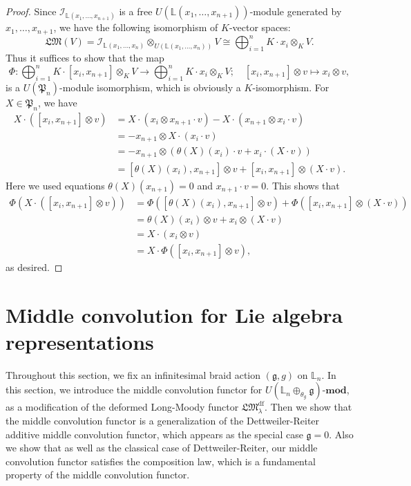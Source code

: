 \documentclass[a4paper,12pt]{article}
\theoremstyle{definition}
\theoremstyle{remark}
\begin{document}
\begin{proof}
Since $\mathcal{I}_{\mathbb{L}(x_{1},\ldots,x_{n+1})}$
is a free $U(\mathbb{L}(x_{1},\ldots,x_{n+1}))$-module generated by $x_{1},\ldots,x_{n+1}$, 
we have the following isomorphism of $K$-vector spaces:
\[
	\mathfrak{LM}(V)=\mathcal{I}_{\mathbb{L}(x_{1},\ldots,x_{n})}\otimes_{U(\mathbb{L}(x_{1},\ldots,x_{n}))} V\cong \bigoplus_{i=1}^{n} K\cdot x_{i} \otimes_{K} V.
\] 
Thus it suffices to show that 
the map   
\[
	\Phi\colon \bigoplus_{i=1}^{n} K\cdot [x_{i},x_{n+1}] \otimes_{K} V\rightarrow 
	\bigoplus_{i=1}^{n} K\cdot x_{i} \otimes_{K} V;\quad
	[x_i,x_{n+1}]\otimes v\mapsto x_{i}\otimes v,
\]
is a $U(\mathfrak{P}_{n})$-module isomorphism, which is obviously a $K$-isomorphism.
For $X\in \mathfrak{P}_{n}$,
we have 
\begin{align*}
	X\cdot ([x_i,x_{n+1}]\otimes v)&=X\cdot (x_{i}\otimes x_{n+1}\cdot v)-X\cdot (x_{n+1}\otimes x_{i}\cdot v)\\
	&=-x_{n+1}\otimes X\cdot (x_{i}\cdot v)\\
	&=-x_{n+1}\otimes (\theta(X)(x_{i})\cdot v+x_{i}\cdot(X\cdot v))\\
	&=[\theta(X)(x_{i}),x_{n+1}]\otimes v+[x_{i},x_{n+1}]\otimes (X\cdot v).
\end{align*}
Here we used equations 
$\theta(X)(x_{n+1})=0$ and $x_{n+1}\cdot v=0$.
This shows that 
\begin{align*}
	\Phi(X\cdot ([x_i,x_{n+1}]\otimes v))&=
	\Phi([\theta(X)(x_{i}),x_{n+1}]\otimes v)+\Phi([x_{i},x_{n+1}]\otimes (X\cdot v))\\
	&=\theta(X)(x_{i})\otimes v+x_{i}\otimes (X\cdot v)\\
	&=X\cdot (x_{i}\otimes v)\\
	&=X\cdot \Phi([x_i,x_{n+1}]\otimes v),
\end{align*}
as desired.
\end{proof}
\section{Middle convolution for Lie algebra representations}\label{sec:midconv}
Throughout this section, we fix an infinitesimal braid action $(\mathfrak{g},g)$ on $\mathbb{L}_{n}$.
In this section, we introduce the middle convolution functor for $U(\mathbb{L}_{n}\oplus_{\theta_{g}} \mathfrak{g})\text{-}\mathbf{mod}$, 
as a modification of the deformed Long-Moody functor $\mathfrak{LM}^{\mathrm{df}}_{\lambda}$.
Then we show that the middle convolution functor is a generalization of the Dettweiler-Reiter additive 
middle convolution functor, which appears as the special case $\mathfrak{g}=0$.
Also we show that as well as the classical case of Dettweiler-Reiter, 
our middle convolution functor satisfies the composition law, which is a fundamental property of the middle convolution functor. 
\end{document}

